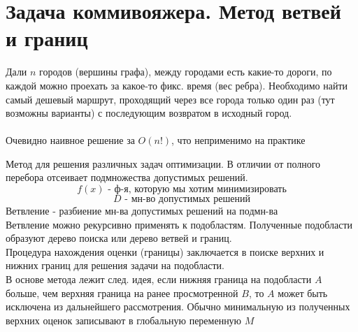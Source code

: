 \documentclass[discrete.tex]{subfiles}
\begin{document}
    \section{Задача коммивояжера. Метод ветвей и границ}

    \begin{task}
        Дали $n$ городов (вершины графа), между городами есть какие-то дороги, 
        по каждой можно проехать за какое-то фикс. время (вес ребра). 
        Необходимо найти самый дешевый маршрут, проходящий через все города
        только один раз (тут возможны варианты) с последующим возвратом в 
        исходный город.\\
        \\
        Очевидно наивное решение за $O(n!)$, что неприменимо на практике
    \end{task}

    \begin{Definition}
        Метод для решения различных задач оптимизации. В отличии от полного 
        перебора отсеивает подмножества допустимых решений. 
        \[f(x) \text{ - ф-я, которую мы хотим минимизировать}\]
        \[D \text{ - мн-во допустимых решений}\]
        Ветвление - разбиение мн-ва допустимых решений на подмн-ва\\
        Ветвление можно рекурсивно применять к подобластям. Полученные 
        подобласти образуют дерево поиска или дерево ветвей и границ. \\
        Процедура нахождения оценки (границы) заключается в поиске верхних и 
        нижних границ для решения задачи на подобласти.\\
        В основе метода лежит след. идея, если нижняя граница на подобласти 
        $A$ больше, чем верхняя граница на ранее просмотренной $B$, то 
        $A$ может быть исключена из дальнейшего рассмотрения.
        Обычно минимальную из полученных верхних оценок записывают
        в глобальную переменную $M$
    \end{Definition}
\end{document}
